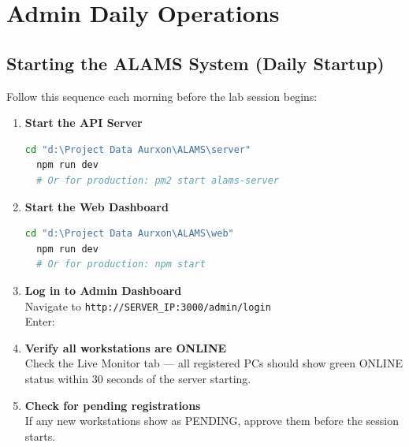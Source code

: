 \chapter{Admin Daily Operations}
\label{ch:operations}

\section{Starting the ALAMS System (Daily Startup)}

Follow this sequence each morning before the lab session begins:

\begin{enumerate}[leftmargin=*, label=\textbf{\arabic*.}, itemsep=6pt]
  \item \textbf{Start the API Server}
  \begin{tcolorbox}[codebox, title={Terminal 1 — API Server}]
  \begin{lstlisting}[language=bash]
  cd "d:\Project Data Aurxon\ALAMS\server"
  npm run dev
  # Or for production: pm2 start alams-server
  \end{lstlisting}
  \end{tcolorbox}

  \item \textbf{Start the Web Dashboard}
  \begin{tcolorbox}[codebox, title={Terminal 2 — Web Dashboard}]
  \begin{lstlisting}[language=bash]
  cd "d:\Project Data Aurxon\ALAMS\web"
  npm run dev
  # Or for production: npm start
  \end{lstlisting}
  \end{tcolorbox}

  \item \textbf{Log in to Admin Dashboard}\\
  Navigate to \texttt{http://SERVER\_IP:3000/admin/login}\\
  Enter: 

  \item \textbf{Verify all workstations are ONLINE}\\
  Check the Live Monitor tab — all registered PCs should show green ONLINE status within 30 seconds of the server starting.

  \item \textbf{Check for pending registrations}\\
  If any new workstations show as PENDING, approve them before the session starts.
\end{enumerate}

